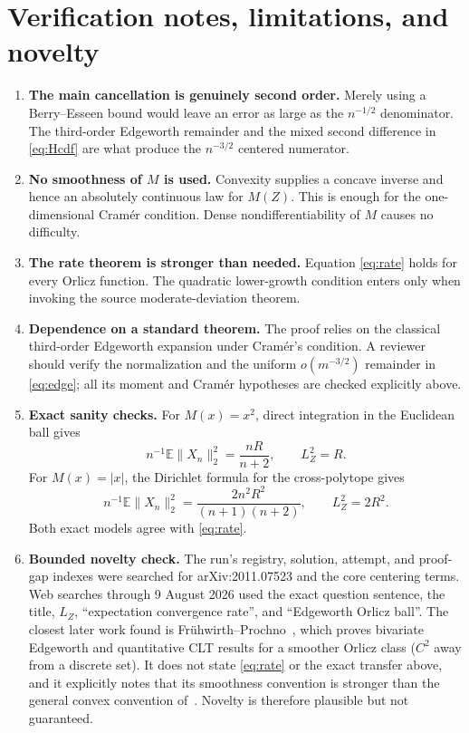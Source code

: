 \documentclass[11pt]{article}
\newcommand{\E}{\mathbb E}
\begin{document}
\section{Verification notes, limitations, and novelty}

\begin{enumerate}[leftmargin=*,itemsep=0.55em]
\item \textbf{The main cancellation is genuinely second order.}  Merely
using a Berry--Esseen bound would leave an error as large as the
$n^{-1/2}$ denominator.  The third-order Edgeworth remainder and the mixed
second difference in \eqref{eq:Hcdf} are what produce the
$n^{-3/2}$ centered numerator.

\item \textbf{No smoothness of $M$ is used.}  Convexity supplies a concave
inverse and hence an absolutely continuous law for $M(Z)$.  This is enough
for the one-dimensional Cram\'er condition.  Dense nondifferentiability of
$M$ causes no difficulty.

\item \textbf{The rate theorem is stronger than needed.}  Equation
\eqref{eq:rate} holds for every Orlicz function.  The quadratic lower-growth
condition enters only when invoking the source moderate-deviation theorem.

\item \textbf{Dependence on a standard theorem.}  The proof relies on the
classical third-order Edgeworth expansion under Cram\'er's condition.  A
reviewer should verify the normalization and the uniform
$o(m^{-3/2})$ remainder in \eqref{eq:edge}; all its moment and Cram\'er
hypotheses are checked explicitly above.

\item \textbf{Exact sanity checks.}  For $M(x)=x^2$, direct integration in
the Euclidean ball gives
\[
 n^{-1}\E\|X_n\|_2^2=\frac{nR}{n+2},\qquad L_Z^2=R.
\]
For $M(x)=|x|$, the Dirichlet formula for the cross-polytope gives
\[
 n^{-1}\E\|X_n\|_2^2=\frac{2n^2R^2}{(n+1)(n+2)},
 \qquad L_Z^2=2R^2.
\]
Both exact models agree with \eqref{eq:rate}.

\item \textbf{Bounded novelty check.}  The run's registry, solution,
attempt, and proof-gap indexes were searched for arXiv:2011.07523 and the
core centering terms.  Web searches through 9 August 2026 used the exact
question sentence, the title, $L_Z$, ``expectation convergence rate'', and
``Edgeworth Orlicz ball''.  The closest later work found is
Fr\"uhwirth--Prochno~\cite{FP}, which proves bivariate Edgeworth and
quantitative CLT results for a smoother Orlicz class ($C^2$ away from a
discrete set).  It does not state \eqref{eq:rate} or the exact transfer above,
and it explicitly notes that its smoothness convention is stronger than the
general convex convention of~\cite{AP}.  Novelty is therefore plausible but
not guaranteed.


\end{enumerate}
\end{document}
